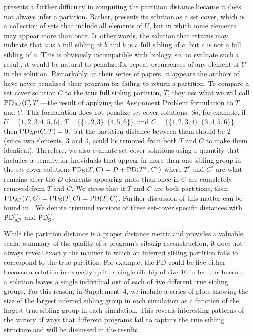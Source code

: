 \kinalyzer{} presents a further difficulty in computing the partition distance because it does not always 
infer a partition.  Rather, \kinalyzer{} presents its solution as a set cover, which is a collection of 
sets that include all elements of $U$, but in which some elements may appear more than once.  In other 
words, the solution that \kinalyzer{} returns may indicate that $a$ is a full sibling of $b$ and $b$ is a 
full sibling of $c$, but $c$ is not a full sibling of $a$.  This is obviously incompatible with
biology, so, to evaluate such a result, it would be natural to penalize for repeat 
occurrences of any element of $U$ in the solution.  Remarkably, in their series of papers, it appears 
the authors of \kinalyzer{} have never penalized their program for failing to return a partition.  To 
compare a set cover solution $C$ to the true full sibling partition, $T$, they use what we will call $
\mathrm{PD_{AP}}(C,T)$---the result of applying the Assignment Problem formulation to $T$ and $C$.     This 
formulation does not penalize set cover solutions.  So, for example, if  $U=\{1,2,3,4,5,6\}$,
$T=\{\{1,2,3\},\{4,5,6\}\}$, and $C=\{\{1,2,3,4\}, \{3,4,5,6\}\}$, then $\mathrm{PD_{AP}}(C,T)=0$, but the partition 
distance between them should be 2 (since two elements, 3 and 4, could be removed from both $T$ and $C$ 
to make them identical).    Therefore, we also evaluate set cover solutions using a quantity that 
includes a penalty for indviduals that appear in more than one sibling group in the set cover solution: 
$\mathrm{PD_S}(T,C)= D+\mathrm{PD}(T^*,C^*)$ where $T^*$ and $C^*$ are what remains after the $D$ elements appearing 
more than once in $C$ are completely removed from $T$ and $C$.  We stress that if $T$ and $C$ are both 
partitions, then $\mathrm{PD_{AP}}(T,C) = \mathrm{PD_S}(T,C)=\mathrm{PD}(T,C)$. 
Further discussion of this matter can be found in \citet{almudevar11}. 
We denote trimmed versions of these set-cover specific distances with $\mathrm{PD_{AP}^T}$ and $\mathrm{PD_S^T}$.

While the partition distance is a proper distance metric and provides a valuable scalar summary of the 
quality of a program's sibship reconstruction, it does not always reveal exactly the manner in which an 
inferred sibling  partition fails to correspond to the true partition.  For example, the PD could be 
five either because a solution incorrectly splits a single sibship of size 10 in half, or because a 
solution leaves a single individual out of each of five different true sibling groups.  For this 
reason, in Supplement~4, we include a series of plots showing the size of the largest inferred sibling 
group in each simulation as a function of the largest true sibling group in each simulation.  This 
reveals interesting patterns of the variety of ways that different programs fail to capture the true 
sibling structure and will be discussed in the results.

